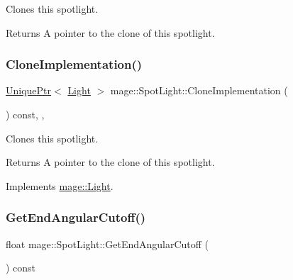 Clones this spotlight.

\begin{DoxyReturn}{Returns}
A pointer to the clone of this spotlight. 
\end{DoxyReturn}
\hypertarget{classmage_1_1_spot_light_a060044ae1de97143878ad26524f03709}{}\label{classmage_1_1_spot_light_a060044ae1de97143878ad26524f03709} 
\subsubsection{\texorpdfstring{Clone\+Implementation()}{CloneImplementation()}}
{\footnotesize\ttfamily \hyperlink{namespacemage_a3316d7143a973e37adf1110f2e80ca31}{Unique\+Ptr}$<$ \hyperlink{classmage_1_1_light}{Light} $>$ mage\+::\+Spot\+Light\+::\+Clone\+Implementation (\begin{DoxyParamCaption}{ }\end{DoxyParamCaption}) const\hspace{0.3cm}{\ttfamily [override]}, {\ttfamily [private]}, {\ttfamily [virtual]}}

Clones this spotlight.

\begin{DoxyReturn}{Returns}
A pointer to the clone of this spotlight. 
\end{DoxyReturn}


Implements \hyperlink{classmage_1_1_light_aa613d76a1ebda69efde853d15f75490c}{mage\+::\+Light}.

\hypertarget{classmage_1_1_spot_light_a9e1ec369a3f42a4662c4cde2aa4a9ac4}{}\label{classmage_1_1_spot_light_a9e1ec369a3f42a4662c4cde2aa4a9ac4} 
\subsubsection{\texorpdfstring{Get\+End\+Angular\+Cutoff()}{GetEndAngularCutoff()}}
{\footnotesize\ttfamily float mage\+::\+Spot\+Light\+::\+Get\+End\+Angular\+Cutoff (\begin{DoxyParamCaption}{ }\end{DoxyParamCaption}) const\hspace{0.3cm}{\ttfamily [noexcept]}}

